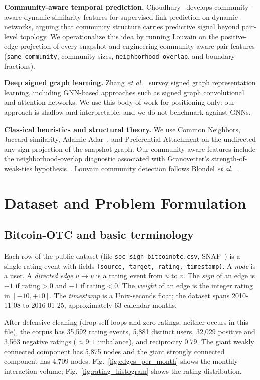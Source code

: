 \documentclass[conference]{IEEEtran}
\newcommand{\code}[1]{\texttt{#1}}
\begin{document}
\textbf{Community-aware temporal prediction.}
Choudhury~\cite{choudhury2024} develops community-aware dynamic
similarity features for supervised link prediction on dynamic
networks, arguing that community structure carries predictive signal
beyond pair-level topology. We operationalize this idea by running
Louvain on the positive-edge projection of every snapshot and
engineering community-aware pair features
(\code{same\_community}, community sizes, \code{neighborhood\_overlap},
and boundary fractions).

\textbf{Deep signed graph learning.} Zhang \emph{et al.}~\cite{zhang2024}
survey signed graph representation learning, including
GNN-based approaches such as signed graph convolutional and attention
networks. We use this body of work for positioning only: our approach
is shallow and interpretable, and we do not benchmark against GNNs.

\textbf{Classical heuristics and structural theory.} We use Common
Neighbors, Jaccard similarity, Adamic-Adar~\cite{adamic2003}, and
Preferential Attachment on the undirected any-sign projection of the
snapshot graph. Our community-aware features include the
neighborhood-overlap diagnostic associated with Granovetter's
strength-of-weak-ties hypothesis~\cite{granovetter1973}. Louvain
community detection follows Blondel \emph{et al.}~\cite{blondel2008}.

\section{Dataset and Problem Formulation}

\subsection{Bitcoin-OTC and basic terminology}
Each row of the public dataset (file \code{soc-sign-bitcoinotc.csv},
SNAP~\cite{snap}) is a single rating event with fields
\code{(source, target, rating, timestamp)}. A \emph{node} is a user.
A \emph{directed edge} $u \to v$ is a rating event from $u$ to $v$. The
\emph{sign} of an edge is $+1$ if $\text{rating} > 0$ and $-1$ if
$\text{rating} < 0$. The \emph{weight} of an edge is the integer
rating in $[-10, +10]$. The \emph{timestamp} is a Unix-seconds float;
the dataset spans 2010-11-08 to 2016-01-25, approximately 63 calendar
months.

After defensive cleaning (drop self-loops and zero ratings; neither
occurs in this file), the corpus has 35{,}592 rating events, 5{,}881
distinct users, 32{,}029 positive and 3{,}563 negative ratings
($\approx 9{:}1$ imbalance), and reciprocity $0.79$. The giant
weakly connected component has 5{,}875 nodes and the giant strongly
connected component has 4{,}709 nodes. Fig.~\ref{fig:edges_per_month}
shows the monthly interaction volume; Fig.~\ref{fig:rating_histogram}
shows the rating distribution.
\end{document}
